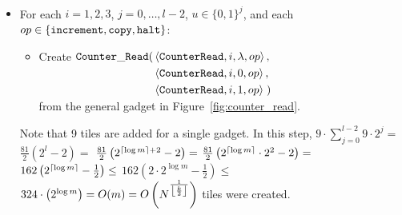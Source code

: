 \subsubsection{\cread}

\begin{itemize}
    \item For each $i = 1,2,3$,
                   $j = 0,\ldots,l-2$,
                   $u \in \{0, 1\}^j$, and each
                   $\inc \in \ops$:
    \begin{itemize}
        \item Create
        $\begin{aligned}[t]
            \cread(& \left\langle {\tt CounterRead}, i, \lambda, \inc \right\rangle, \\
                   & \left\langle {\tt CounterRead}, i, 0,       \inc \right\rangle, \\
                   & \left\langle {\tt CounterRead}, i, 1,       \inc \right\rangle \;)
        \end{aligned}$\\ from the general gadget in Figure~\ref{fig:counter_read}.
    \end{itemize}
    Note that 9 tiles are added for a single {\cread} gadget.
    In this step,
    $9 \cdot \sum_{j=0}^{l - 2} 9 \cdot 2^j = $
    $\frac{81}{2} \left( 2^{l} - 2\right) = $
    $\frac{81}{2} \left( 2^{\ceil*{\log m} + 2} - 2 \right) = $
    $\frac{81}{2} \left( 2^{\ceil*{\log m}} \cdot 2^2 - 2 \right) =$
    $162 \left( 2^{\ceil*{\log m}} - \frac{1}{2} \right) \leq$
    $162 \left(2 \cdot 2^{\log m} - \frac{1}{2} \right) \leq$
    $324 \cdot \left(2^{\log m} \right) = O(m) = O\left( \upperbound \right)$ tiles were created.

\end{itemize}

